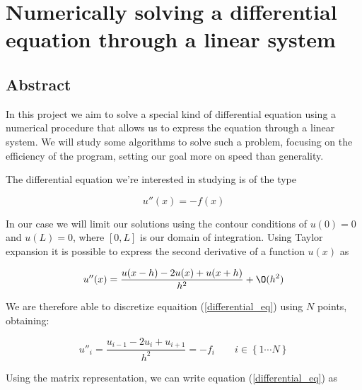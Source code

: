 \documentclass {article}
\begin{document}
\section{\LARGE Numerically solving a differential equation through a linear system}

\subsection{Abstract}

In this project we aim to solve a special kind of differential equation using a numerical procedure that allows us to express the equation through a linear system. We will study some algorithms to solve such a problem, focusing on the efficiency of the program, setting our goal more on speed than generality. 

The differential equation we're interested in studying is of the type

\begin{equation}
	u''(x)= - f(x)
	\label{differential_eq}
\end{equation}

In our case we will limit our solutions using the contour conditions of $u(0)=0$ and $u(L)=0$, where $[0, L]$ is our domain of integration.
Using Taylor expansion it is possible to express the second derivative of a function $u(x)$ as

\begin{equation}
	u''(x)= \frac{u(x-h)-2 u(x)+u(x+h)}{h^2}+ \O (h^2)
\end{equation}

We are therefore able to discretize equaition (\ref{differential_eq}) using $N$ points, obtaining:

$$u''_i= \frac{u_{i-1}-2 u_i+u_{i+1}}{h^2}=-f_i \quad \quad i \in \left\lbrace 1 \cdots N\right\rbrace$$

Using the matrix representation, we can write equation (\ref{differential_eq}) as
\end{document}
